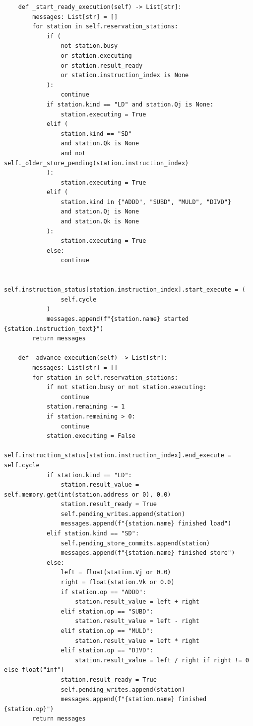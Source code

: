 \documentclass[12pt,a4paper]{ctexart}
\begin{document}
\begin{lstlisting}
    def _start_ready_execution(self) -> List[str]:
        messages: List[str] = []
        for station in self.reservation_stations:
            if (
                not station.busy
                or station.executing
                or station.result_ready
                or station.instruction_index is None
            ):
                continue
            if station.kind == "LD" and station.Qj is None:
                station.executing = True
            elif (
                station.kind == "SD"
                and station.Qk is None
                and not self._older_store_pending(station.instruction_index)
            ):
                station.executing = True
            elif (
                station.kind in {"ADDD", "SUBD", "MULD", "DIVD"}
                and station.Qj is None
                and station.Qk is None
            ):
                station.executing = True
            else:
                continue

            self.instruction_status[station.instruction_index].start_execute = (
                self.cycle
            )
            messages.append(f"{station.name} started {station.instruction_text}")
        return messages

    def _advance_execution(self) -> List[str]:
        messages: List[str] = []
        for station in self.reservation_stations:
            if not station.busy or not station.executing:
                continue
            station.remaining -= 1
            if station.remaining > 0:
                continue
            station.executing = False
            self.instruction_status[station.instruction_index].end_execute = self.cycle
            if station.kind == "LD":
                station.result_value = self.memory.get(int(station.address or 0), 0.0)
                station.result_ready = True
                self.pending_writes.append(station)
                messages.append(f"{station.name} finished load")
            elif station.kind == "SD":
                self.pending_store_commits.append(station)
                messages.append(f"{station.name} finished store")
            else:
                left = float(station.Vj or 0.0)
                right = float(station.Vk or 0.0)
                if station.op == "ADDD":
                    station.result_value = left + right
                elif station.op == "SUBD":
                    station.result_value = left - right
                elif station.op == "MULD":
                    station.result_value = left * right
                elif station.op == "DIVD":
                    station.result_value = left / right if right != 0 else float("inf")
                station.result_ready = True
                self.pending_writes.append(station)
                messages.append(f"{station.name} finished {station.op}")
        return messages


\end{lstlisting}
\end{document}
